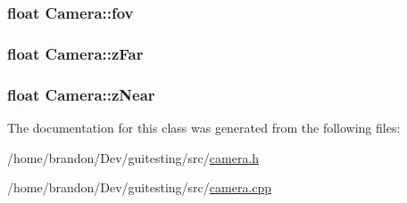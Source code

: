 \hypertarget{class_camera_ff7393c9cfbccd7e369091f00008da93}{
\subsubsection[{fov}]{\setlength{\rightskip}{0pt plus 5cm}float {\bf Camera::fov}}}
\label{class_camera_ff7393c9cfbccd7e369091f00008da93}


\hypertarget{class_camera_6290469f972a5903c805725db563f41f}{
\subsubsection[{zFar}]{\setlength{\rightskip}{0pt plus 5cm}float {\bf Camera::zFar}}}
\label{class_camera_6290469f972a5903c805725db563f41f}


\hypertarget{class_camera_1db2166635ff27594eda3a23130b66ac}{
\subsubsection[{zNear}]{\setlength{\rightskip}{0pt plus 5cm}float {\bf Camera::zNear}}}
\label{class_camera_1db2166635ff27594eda3a23130b66ac}




The documentation for this class was generated from the following files:\begin{CompactItemize}
\item 
/home/brandon/Dev/guitesting/src/\hyperlink{camera_8h}{camera.h}\item 
/home/brandon/Dev/guitesting/src/\hyperlink{camera_8cpp}{camera.cpp}\end{CompactItemize}
